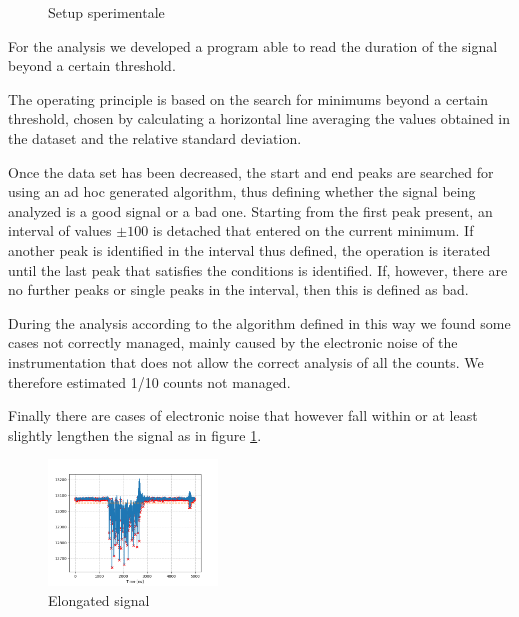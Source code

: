 \documentclass[a4paper,twoside,openany]{book}
\begin{document}
\begin{figure}[H]
\centering
{}
\caption{Setup sperimentale}
\end{figure}

For the analysis we developed a program able to read the duration of the signal beyond a certain threshold.

The operating principle is based on the search for minimums beyond a certain threshold, chosen by calculating a horizontal line averaging the values obtained in the dataset and the relative standard deviation.

Once the data set has been decreased, the start and end peaks are searched for using an ad hoc generated algorithm, thus defining whether the signal being analyzed is a good signal or a bad one. Starting from the first peak present, an interval of values $\pm100$ is detached that entered on the current minimum. If another peak is identified in the interval thus defined, the operation is iterated until the last peak that satisfies the conditions is identified. If, however, there are no further peaks or single peaks in the interval, then this is defined as bad.

During the analysis according to the algorithm defined in this way we found some cases not correctly managed, mainly caused by the electronic noise of the instrumentation that does not allow the correct analysis of all the counts. We therefore estimated 1/10 counts not managed.

Finally there are cases of electronic noise that however fall within or at least slightly lengthen the signal as in figure \ref{lungo}.
\begin{figure}[H]
\centering
\includegraphics[width=0.4\textwidth, height=0.3\textwidth]{Bad_rumore4}
\caption{Elongated signal}
\label{lungo}
\end{figure}
\end{document}
